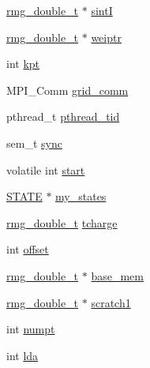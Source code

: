 \begin{DoxyCompactItemize}
\hyperlink{rmgtypes_8h_aaa16921c14f121c56eaa42390a340db8}{rmg\-\_\-double\-\_\-t} $\ast$ \hyperlink{struct_s_c_f___t_h_r_e_a_d___c_o_n_t_r_o_l_a36ec10259bbcf9cf698e946da6905766}{sint\-I}
\item 
\hyperlink{rmgtypes_8h_aaa16921c14f121c56eaa42390a340db8}{rmg\-\_\-double\-\_\-t} $\ast$ \hyperlink{struct_s_c_f___t_h_r_e_a_d___c_o_n_t_r_o_l_ae77fe7b78daf9375f84226ec69e0d712}{weiptr}
\item 
int \hyperlink{struct_s_c_f___t_h_r_e_a_d___c_o_n_t_r_o_l_a1c3db57fd744d722b8d3888226ffafeb}{kpt}
\item 
M\-P\-I\-\_\-\-Comm \hyperlink{struct_s_c_f___t_h_r_e_a_d___c_o_n_t_r_o_l_a3ae0232d120a411429681655a7d1283c}{grid\-\_\-comm}
\item 
pthread\-\_\-t \hyperlink{struct_s_c_f___t_h_r_e_a_d___c_o_n_t_r_o_l_ad404334c689663ba2364f07690fab760}{pthread\-\_\-tid}
\item 
sem\-\_\-t \hyperlink{struct_s_c_f___t_h_r_e_a_d___c_o_n_t_r_o_l_a111f0dc766a801b13bbf8af387be16e3}{sync}
\item 
volatile int \hyperlink{struct_s_c_f___t_h_r_e_a_d___c_o_n_t_r_o_l_ab31fdcc80e84e0f0eb82a3f6afbed9d7}{start}
\item 
\hyperlink{struct_s_t_a_t_e}{S\-T\-A\-T\-E} $\ast$ \hyperlink{struct_s_c_f___t_h_r_e_a_d___c_o_n_t_r_o_l_afec8cfb5382d97b9053f4f6e7ca6e81d}{my\-\_\-states}
\item 
\hyperlink{rmgtypes_8h_aaa16921c14f121c56eaa42390a340db8}{rmg\-\_\-double\-\_\-t} \hyperlink{struct_s_c_f___t_h_r_e_a_d___c_o_n_t_r_o_l_a69a27af23138e6fca82134c4d337a950}{tcharge}
\item 
int \hyperlink{struct_s_c_f___t_h_r_e_a_d___c_o_n_t_r_o_l_a24686ca16e6adf3942516c7e363e7a05}{offset}
\item 
\hyperlink{rmgtypes_8h_aaa16921c14f121c56eaa42390a340db8}{rmg\-\_\-double\-\_\-t} $\ast$ \hyperlink{struct_s_c_f___t_h_r_e_a_d___c_o_n_t_r_o_l_ab886864fbc2e65576a1fee78f7214c29}{base\-\_\-mem}
\item 
\hyperlink{rmgtypes_8h_aaa16921c14f121c56eaa42390a340db8}{rmg\-\_\-double\-\_\-t} $\ast$ \hyperlink{struct_s_c_f___t_h_r_e_a_d___c_o_n_t_r_o_l_ab723da9c6d80b2aef843013bf43fa2d7}{scratch1}
\item 
int \hyperlink{struct_s_c_f___t_h_r_e_a_d___c_o_n_t_r_o_l_a3aa21105ca23c76c54831f5c17ced4c3}{numpt}
\item 
int \hyperlink{struct_s_c_f___t_h_r_e_a_d___c_o_n_t_r_o_l_ac1235cd2cf121ae22d5909dcdcdbcadf}{lda}
\item 

\end{DoxyCompactItemize}
